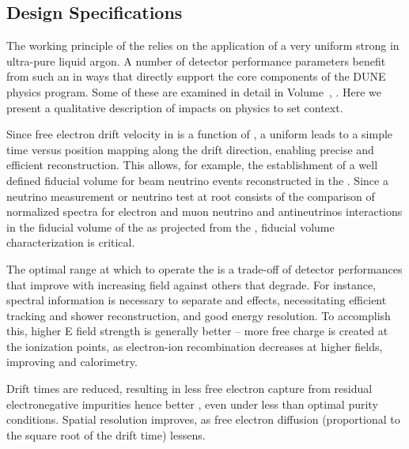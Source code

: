  
\subsection{Design Specifications}
\label{sec:fdsp-hv-des-consid}


The working principle of the  relies on the application of a very uniform strong \efield in ultra-pure liquid argon.  A number of detector performance parameters benefit from such an \efield in ways that directly support the core components of the DUNE physics program.  Some of these are examined in detail in Volume~\volnumberphysics{}, \voltitlephysics{}.  Here we present a qualitative description of \efield impacts on physics to set context.

Since free electron drift velocity in  is a function of \efield, a uniform \efield leads to a simple time versus position mapping along the drift direction, enabling precise and efficient \threed reconstruction.  This allows, for example, the establishment of a well defined fiducial volume for beam neutrino events reconstructed in the .  Since a neutrino  measurement or neutrino  test at root consists of the comparison of normalized spectra for electron and muon neutrino and antineutrinos interactions in the fiducial volume of the  as projected from the , fiducial volume characterization is critical.   

The optimal \efield range at which to operate the  is a trade-off  of detector performances that improve with increasing field against others that degrade. For instance, spectral information is necessary to separate  and  effects, necessitating efficient tracking and shower reconstruction, and good energy resolution. To accomplish this, higher E field strength is generally better -- more free charge is created at the ionization points, as electron-ion recombination decreases at higher fields, improving  and calorimetry. 


Drift times are reduced, resulting in less free electron capture from residual electronegative impurities hence better , even under less than optimal purity conditions.  Spatial resolution improves, as free electron diffusion (proportional to the square root of the drift time) lessens. 

